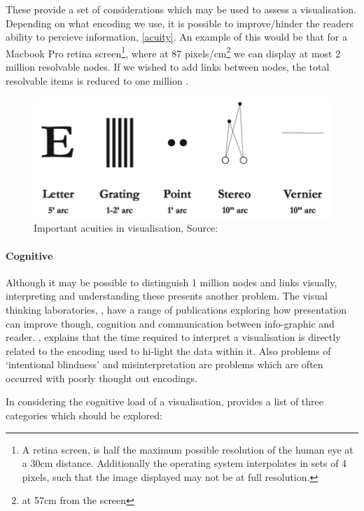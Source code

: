 These provide a set of considerations which may be used to assess a visualisation. Depending on what encoding we use, it is possible to improve/hinder the readers ability to percieve information, \autoref{acuity}. An example of this would be that for a Macbook Pro retina screen\footnote{A retina screen, is half the maximum possible resolution of the human eye at a 30cm distance. Additionally the operating system interpolates in sets of 4 pixels, such that the image displayed may not be at full resolution.}, where at 87 pixels/cm\footnote{at 57cm from the screen} we can display at most 2 million resolvable nodes. If we wished to add links between nodes, the total resolvable items is reduced to one million
\cite{ch10}. 

\begin{figure}[H]
\begin{center}
\includegraphics[scale=.6]{figures_c1/acuity.png}
\end{center}
\caption{Important acuities in visualisation, Source: \cite{ch10,ware}}\label{acuity}
\end{figure}


\paragraph*{Cognitive}
Although it may be possible to distinguish 1 million nodes and links visually, interpreting and understanding these presents another problem. The visual thinking laboratories, \cite{vt}, have a range of publications exploring how presentation can improve though, cognition and communication between info-graphic and reader. \cite{OpenVis}, explains that the time required to interpret a visualisation is directly related to the encoding used to hi-light the data within it. Also problems of `intentional blindness' and misinterpretation are problems which are often occurred with poorly thought out encodings.  

In considering the cognitive load of a visualisation, \cite{emotional} provides a list of three categories which should be explored:


